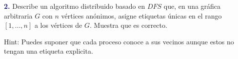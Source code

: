 \newpage
\textbf{\textcolor{MidnightBlue}{2.}}
Describe un algoritmo distribuido basado en $DFS$ que, en una gráfica arbitraria $G$ con $n$ vértices anónimos, asigne etiquetas únicas en el rango $[1, . . . , n]$ a los vértices de $G$. Muestra que es correcto.

Hint: Puedes suponer que cada proceso conoce a sus vecinos aunque estos no tengan una etiqueta explicita.